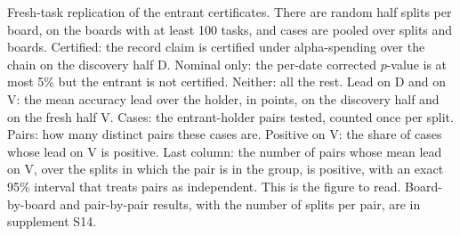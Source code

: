 \documentclass[11pt]{article}
\begin{document}
\begin{table}[t]
\centering\small

\caption{Fresh-task replication of the entrant certificates. There are \NumReplHalR{} random half splits per board, on the boards with at least 100 tasks, and cases are pooled over splits and boards. Certified: the record claim is certified under alpha-spending over the chain on the discovery half D. Nominal only: the per-date corrected $p$-value is at most 5\% but the entrant is not certified. Neither: all the rest. Lead on D and on V: the mean accuracy lead over the holder, in points, on the discovery half and on the fresh half V. Cases: the entrant-holder pairs tested, counted once per split. Pairs: how many distinct pairs these cases are. Positive on V: the share of cases whose lead on V is positive. Last column: the number of pairs whose mean lead on V, over the splits in which the pair is in the group, is positive, with an exact 95\% interval that treats pairs as independent. This is the figure to read. Board-by-board and pair-by-pair results, with the number of splits per pair, are in supplement S14.}
\label{tab:replication}
\end{table}
\end{document}
